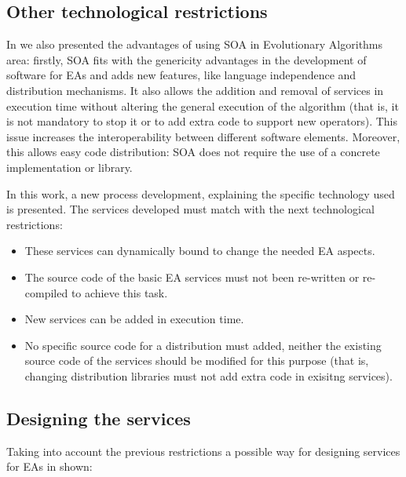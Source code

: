 \subsection{Other technological restrictions}

In \cite{OSGILIATH} we also presented the advantages of using SOA in Evolutionary Algorithms area: firstly, SOA fits with the genericity advantages in the development of software for EAs \cite{GENERICITY05} and adds new features, like language independence and  distribution mechanisms. It also allows the addition and removal of services in execution time without altering the general execution of the algorithm (that is, it is not mandatory to stop it or to add extra code to support new operators). This issue increases the interoperability between different software elements. Moreover, this allows easy code distribution: SOA does not require the use of a concrete implementation or library.

In this work, a new process development, explaining the specific technology used is presented. The services developed must match with the next technological restrictions:
\begin{itemize}
\item These services can dynamically bound to cha\-nge the needed EA aspects. 
\item The source code of  the basic EA services must not been re-written or re-compiled to achieve this task. 
\item New services can be added in execution time. 
\item No specific source code for a distribution must added, neither the existing source code of the services should be modified for this purpose (that is, changing distribution libraries must not add extra code in exisitng services).
\end{itemize}

\subsection{Designing the services}

Taking into account the previous restrictions a possible way for designing services for EAs in shown:

